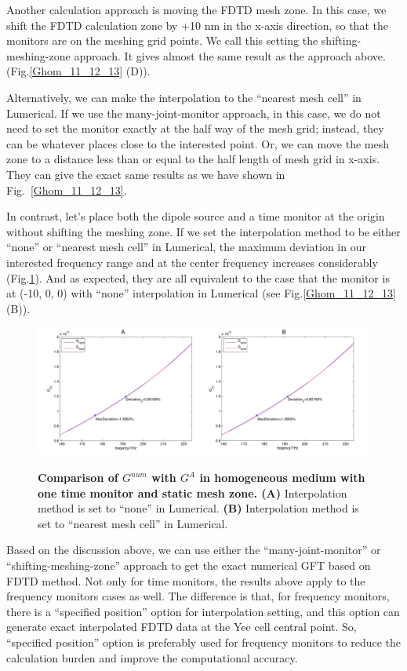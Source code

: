 Another calculation approach is moving the FDTD mesh zone. In this case, we shift the FDTD calculation zone by +10 nm in the x-axis direction, so that the monitors are on the meshing grid points. We call this setting the shifting-meshing-zone approach. It gives almost the same result as the approach above. (Fig.\ref{Ghom_11_12_13} (D)).


Alternatively, we can make the interpolation to the ``nearest mesh cell'' in Lumerical. If we use the many-joint-monitor approach, in this case, we do not need to set the monitor exactly at the half way of the mesh grid; instead, they can be whatever places close to the interested point. Or, we can move the mesh zone to a distance less than or equal to the half length of mesh grid in x-axis. They can give the exact same results as we have shown in Fig.~\ref{Ghom_11_12_13}.

In contrast, let's place both the dipole source and a time monitor at the origin without shifting the meshing zone. If we set the interpolation method to be either ``none'' or ``nearest mesh cell'' in Lumerical, the maximum deviation in our interested frequency range and at the center frequency increases considerably (Fig.\ref{Ghom_7_14}). And as expected, they are all equivalent to the case that the monitor is at (-10, 0, 0) with ``none'' interpolation in Lumerical (see Fig.\ref{Ghom_11_12_13} (B)).
\begin{figure}[htp]
\centering
\begin{center}
{\includegraphics[width=16cm]{./Figs/Ghom_7_14}}
\end{center}
\caption[Comparison of $G_{num}$ with $G^{A}$ in homogeneous medium, in method 2.]{\textbf{Comparison of $G^{num}$ with $G^{A}$ in homogeneous medium with one time monitor and static mesh zone. (A)} Interpolation method is set to ``none'' in Lumerical. \textbf{(B)} Interpolation method is set to ``nearest mesh cell'' in Lumerical. }
\label{Ghom_7_14}
\end{figure}

Based on the discussion above, we can use either the ``many-joint-monitor'' or ``shifting-meshing-zone'' approach to get the exact numerical GFT based on FDTD method. Not only for time monitors, the results above apply to the frequency monitors cases as well. The difference is that, for frequency monitors, there is a ``specified position'' option for interpolation setting, and this option can generate exact interpolated FDTD data at the Yee cell central point. So, ``specified position'' option is preferably used for frequency monitors to reduce the calculation burden and improve the computational accuracy.


